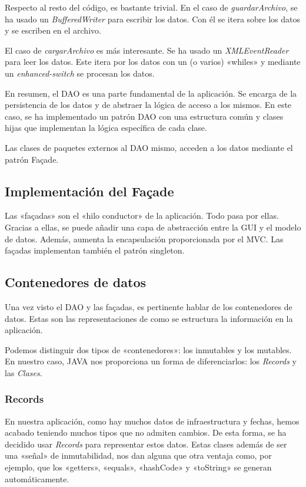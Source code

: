 Respecto al resto del código, es bastante trivial.
En el caso de \textit{guardarArchivo}, se ha usado un \textit{BufferedWriter} para escribir los datos.
Con él se itera sobre los datos y se escriben en el archivo.

El caso de \textit{cargarArchivo} es más interesante.
Se ha usado un \textit{XMLEventReader} para leer los datos.
Este itera por los datos con un (o varios) «whiles» y mediante un \textit{enhanced-switch} se procesan los datos.

En resumen, el DAO es una parte fundamental de la aplicación.
Se encarga de la persistencia de los datos y de abstraer la lógica de acceso a los mismos.
En este caso, se ha implementado un patrón DAO con una estructura común y clases hijas que implementan la lógica específica de cada clase.

Las clases de paquetes externos al DAO mismo, acceden a los datos mediante el patrón Façade.

\subsection{Implementación del Façade}\label{subsec:implementacion_del_facade}
Las «façadas» son el «hilo conductor» de la aplicación.
Todo pasa por ellas.
Gracias a ellas, se puede añadir una capa de abstracción entre la GUI y el modelo de datos.
Además, aumenta la encapsulación proporcionada por el MVC\@.
Las façadas implementan también el patrón singleton.

\subsection{Contenedores de datos}\label{subsec:contenedores_de_datos}

Una vez visto el DAO y las façadas, es pertinente hablar de los contenedores de datos.
Estas son las representaciones de como se estructura la información en la aplicación.

Podemos distinguir dos tipos de «contenedores»: los inmutables y los mutables.
En nuestro caso, JAVA nos proporciona un forma de diferenciarlos: los \textit{Records} y las \textit{Clases}.

\subsubsection{Records}\label{subsubsec:records}
En nuestra aplicación, como hay muchos datos de infraestructura y fechas,
hemos acabado teniendo muchos tipos que no admiten cambios.
De esta forma, se ha decidido usar \textit{Records} para representar estos datos.
Estas clases además de ser una «señal» de inmutabilidad,
nos dan alguna que otra ventaja como, por ejemplo, que los «getters», «equals», «hashCode» y «toString» se generan automáticamente.


